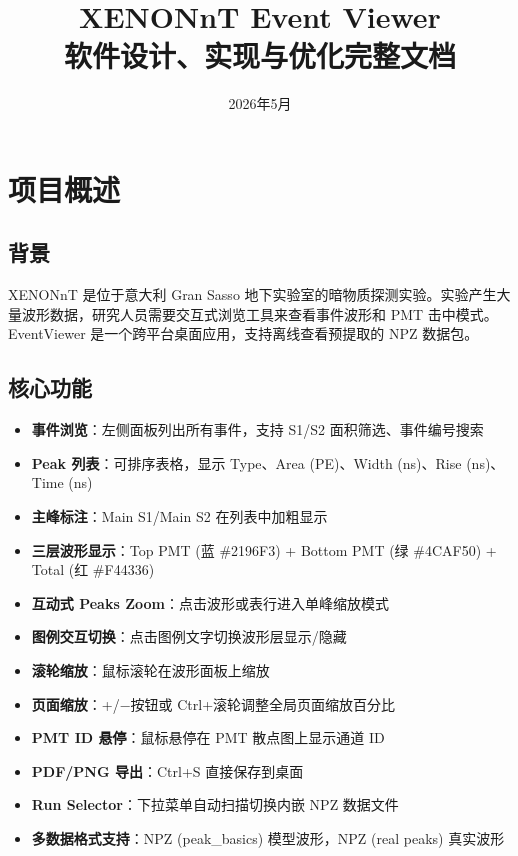 \documentclass[12pt,a4paper]{article}
\title{XENONnT Event Viewer \\ 软件设计、实现与优化完整文档}
\author{}
\date{2026年5月}
\begin{document}
\maketitle
\tableofcontents
\newpage

\section{项目概述}

\subsection{背景}

XENONnT 是位于意大利 Gran Sasso 地下实验室的暗物质探测实验。实验产生大量波形数据，研究人员需要交互式浏览工具来查看事件波形和 PMT 击中模式。EventViewer 是一个跨平台桌面应用，支持离线查看预提取的 NPZ 数据包。

\subsection{核心功能}

\begin{itemize}[itemsep=3pt]
\item \textbf{事件浏览}：左侧面板列出所有事件，支持 S1/S2 面积筛选、事件编号搜索
\item \textbf{Peak 列表}：可排序表格，显示 Type、Area (PE)、Width (ns)、Rise (ns)、Time (ns)
\item \textbf{主峰标注}：Main S1/Main S2 在列表中加粗显示
\item \textbf{三层波形显示}：Top PMT (蓝 \#2196F3) + Bottom PMT (绿 \#4CAF50) + Total (红 \#F44336)
\item \textbf{互动式 Peaks Zoom}：点击波形或表行进入单峰缩放模式
\item \textbf{图例交互切换}：点击图例文字切换波形层显示/隐藏
\item \textbf{滚轮缩放}：鼠标滚轮在波形面板上缩放
\item \textbf{页面缩放}：+/−按钮或 Ctrl+滚轮调整全局页面缩放百分比
\item \textbf{PMT ID 悬停}：鼠标悬停在 PMT 散点图上显示通道 ID
\item \textbf{PDF/PNG 导出}：Ctrl+S 直接保存到桌面
\item \textbf{Run Selector}：下拉菜单自动扫描切换内嵌 NPZ 数据文件
\item \textbf{多数据格式支持}：NPZ (peak\_basics) 模型波形，NPZ (real peaks) 真实波形
\end{itemize}
\end{document}
